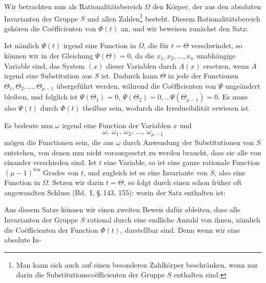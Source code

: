 Wir betrachten nun als Rationalitätsbereich $\Omega$ den Körper,
der aus den absoluten Invarianten der Gruppe $S$ und allen
Zahlen\footnote{Man kann sich auch auf einen besonderen Zahlkörper beschränken, wenn nur darin die Substitutionsco\"efficienten der Gruppe $S$ enthalten sind.} besteht. Diesem Rationalitätsbereich gehören die Co\"efficienten
von $\Phi(t)$ an, und wir beweisen zunächst den Satz:


Ist nämlich $\Psi(t)$ irgend eine Function in $\Omega$, die für $t = \Theta$
verschwindet, so können wir in der Gleichung $\Psi(\Theta) = 0$, da
die $x_1, x_2, \dots, x_n$ unabhängige Variable sind, das System $(x)$
dieser Variablen durch $A(x)$ ersetzen, wenn $A$ irgend eine Substitution
aus $S$ ist. Dadurch kann $\Theta$ in jede der Functionen
$\Theta_1, \Theta_2, \dots, \Theta_{\mu-1}$ übergeführt werden, während die Co\"efficienten
von $\Psi$ ungeändert bleiben, und folglich ist $\Psi(\Theta_1) = 0$,
$\Psi(\Theta_2) = 0, \dots \Psi(\Theta_{\mu-1}) = 0$. Es muss also $\Psi(t)$ durch $\Phi(t)$
theilbar sein, wodurch die Irreducibilität erwiesen ist.

Es bedeute nun $\omega$ irgend eine Function der Variablen $x$ und
\[ \omega,\ \omega_1,\ \omega_2,\ \dots,\ \omega_{\mu-1} \]
mögen die Functionen sein, die aus $\omega$ durch Anwendung der
Substitutionen von $S$ entstehen, von denen nun nicht vorausgesetzt
zu werden braucht, dass sie alle von einander verschieden
sind. Ist $t$ eine Variable, so ist
eine ganze rationale Function $(\mu-1)^{\text{ten}}$ Grades von $t$, und zugleich
ist es eine Invariante von $S$, also eine Function in $\Omega$.
Setzen wir darin $t = \Theta$, so folgt durch einen schon früher oft
angewandten Schluss (Bd.\ I, \S.\,143, 155):
worin der Satz enthalten ist:


Aus diesem Satze können wir einen zweiten Beweis dafür
ableiten, dass alle Invarianten der Gruppe $S$ rational durch eine
endliche Anzahl von ihnen, nämlich die Co\"efficienten der Function
$\Phi(t)$, darstellbar sind. Denn wenn wir eine absolute In-
